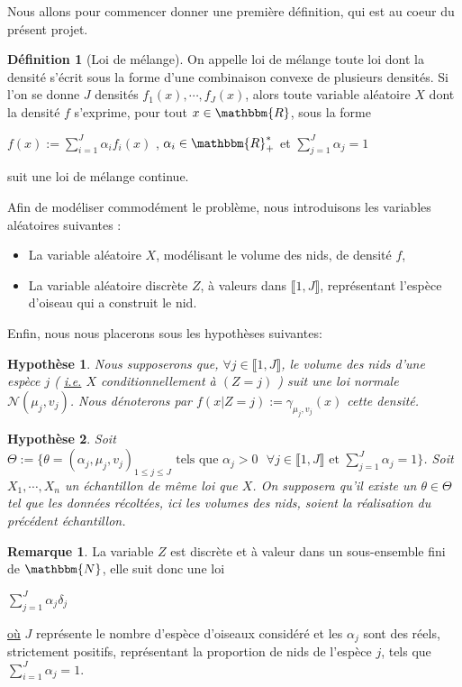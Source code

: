 \documentclass[frenchb]{report}
\newcommand{\R}{\mathbbm{R}}
\newcommand{\N}{\mathbbm{N}}
\newcommand{\1}{\mathbbm{1}}
\newcommand{\n}{\mathcal{N}}
\newtheorem{hyp}{Hypothèse}
\theoremstyle{definition}\newtheorem{defn}{Définition}
\theoremstyle{definition}\newtheorem{exm}{Exemple}
\theoremstyle{definition}\newtheorem{nota}{Notation}
\theoremstyle{definition}\newtheorem{rem}{Remarque}
\begin{document}
Nous allons pour commencer donner une première définition, qui est au coeur du présent projet.

\begin{defn}[Loi de mélange]
On appelle loi de mélange toute loi dont la densité s'écrit sous la forme d'une combinaison convexe de plusieurs densités. Si l'on se donne $J$  densités $f_1(x), \cdots, f_J(x)$, alors toute variable aléatoire $X$ dont la densité $f$ s'exprime, pour tout $x\in\R$, sous la forme
\begin{center}
$f(x) := \displaystyle\sum_{i=1}^J \alpha_i f_i(x)$ , $\alpha_i \in\R_+^*$ et $\displaystyle\sum_{j=1}^J\alpha_j=1$ \end{center}
suit une loi de mélange continue.
\end{defn}

Afin de modéliser commodément le problème, nous introduisons les variables aléatoires suivantes :

\begin{itemize}[label=\adfflowerleft]
	\item La variable aléatoire $X$, modélisant le volume des nids, de densité $f$,
	\item La variable aléatoire discrète $Z$, à valeurs dans $\llbracket 1,J\rrbracket$, représentant l'espèce d'oiseau qui a construit le nid.
\end{itemize}

Enfin, nous nous placerons sous les hypothèses suivantes:

\begin{hyp}
Nous supposerons que, $\forall j\in \llbracket 1,J \rrbracket$, le volume des nids d'une espèce $j$ ( \underline{i.e.} $X$ conditionnellement à $(Z=j)$ ) suit une loi normale $\n(\mu_j,v_j)$. Nous dénoterons par $f(x | Z = j) := \gamma_{\mu_j, v_j}(x)$ cette densité.
\end{hyp}


\begin{hyp}
Soit $\Theta := \{ \theta = (\alpha_j,\mu_j, v_j)_{1 \leq j \leq J} \text{ tels que } \alpha_j > 0 \text{ } \forall j\in \llbracket 1,J\rrbracket \text{ et } \displaystyle\sum_{j=1}^J\alpha_j=1\}$. Soit $X_1, \cdots, X_n$ un échantillon de même loi que $X$. On supposera qu'il existe un $\theta \in \Theta$ tel que les données récoltées, ici les volumes des nids, soient la réalisation du précédent échantillon.
\end{hyp}

\begin{rem}
La variable $Z$ est discrète et à valeur dans un sous-ensemble fini de $\N$, elle suit donc une loi 
\begin{center} $\displaystyle \sum_{j=1}^J \alpha_j\delta_j$ \end{center}
\underline{où} $J$ représente le nombre d'espèce d'oiseaux considéré et les $\alpha_j$ sont des réels, strictement positifs, représentant la proportion de nids de l'espèce $j$, tels que $\displaystyle\sum_{i=1}^J \alpha_j = 1$.
\end{rem}
\end{document}
